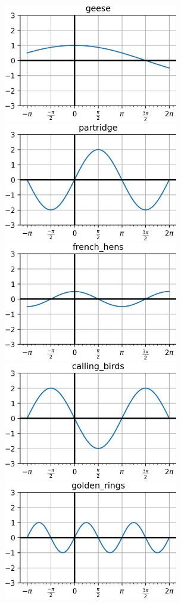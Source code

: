\documentclass{article}
\begin{document}
\begin{multicols}{2}
\noindent
\includegraphics[width=3in]{geese.png} \\
\includegraphics[width=3in]{partridge.png} \\
\includegraphics[width=3in]{french_hens.png} \\
\includegraphics[width=3in]{calling_birds.png} \\
\includegraphics[width=3in]{golden_rings.png} \\

\end{multicols}
\end{document}
